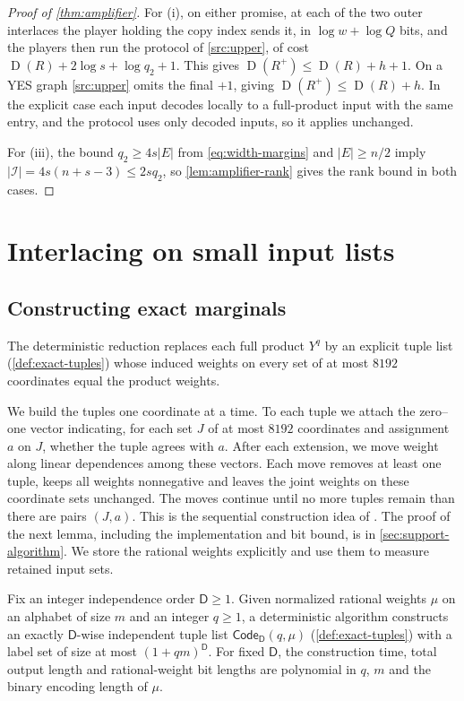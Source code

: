 \documentclass[11pt,letterpaper]{article} \usepackage[utf8]{inputenc}
\theoremstyle{plain} \newtheorem{theorem}{Theorem}[section]
\theoremstyle{definition} \newaliascnt{definition}{theorem}
\newcommand{\D}{\operatorname{D}}
\begin{document}
\begin{proof}[Proof of \cref{thm:amplifier}]
For (i), on either promise, at each of the two outer interlaces the player
holding the copy index sends it, in $\log w+\log Q$ bits, and the
players then run the protocol of \cref{src:upper}, of cost
$\D(R)+2\log s+\log q_2+1$. This gives \(\D(R^+)\le\D(R)+h+1\). On a YES graph
\cref{src:upper} omits the final $+1$, giving \(\D(R^+)\le\D(R)+h\). In the explicit
case each input decodes locally to a full-product input with the same entry,
and the protocol uses only decoded inputs, so it applies unchanged.

For (iii), the bound $q_2\ge4s|E|$ from \eqref{eq:width-margins} and
$|E|\ge n/2$ imply $|\mathcal I|=4s(n+s-3)\le2sq_2$, so
\cref{lem:amplifier-rank} gives the rank bound in both cases.
\end{proof}


\section{Interlacing on small input lists}
\label{sec:small-lists}
\subsection{Constructing exact marginals}

The deterministic reduction replaces each full product $Y^q$ by an explicit tuple
list (\cref{def:exact-tuples}) whose induced weights on every set of at most $8192$
coordinates equal the product weights.

We build the tuples one coordinate at a time. To each tuple we attach the
zero--one vector indicating, for each set $J$ of at most $8192$ coordinates and assignment $a$ on $J$, whether the tuple agrees with $a$.
After each extension, we move weight along linear dependences
among these vectors. Each move removes at least one tuple, keeps all weights
nonnegative and leaves the joint weights on these coordinate sets unchanged.
The moves continue until no more tuples remain than there are pairs $(J,a)$. This is the sequential
construction idea of \citet[Section~3]{koller1994sample}. The proof of the
next lemma, including the implementation and bit bound, is in
\cref{sec:support-algorithm}. We store the rational weights
explicitly and use them to measure retained input sets.

\begin{lemma}\label{det:code}
Fix an integer independence order $\mathsf D\ge1$. Given normalized rational weights $\mu$ on an alphabet of
size $m$ and an integer $q\ge1$, a deterministic algorithm constructs an exactly
$\mathsf D$-wise independent tuple list $\mathsf{Code}_{\mathsf D}(q,\mu)$ (\cref{def:exact-tuples}) with
a label set of size at most $(1+qm)^{\mathsf D}$.
For fixed $\mathsf D$, the construction time, total output length and
rational-weight bit lengths are polynomial in $q$, $m$ and the binary encoding
length of $\mu$.
\end{lemma}
\end{document}
